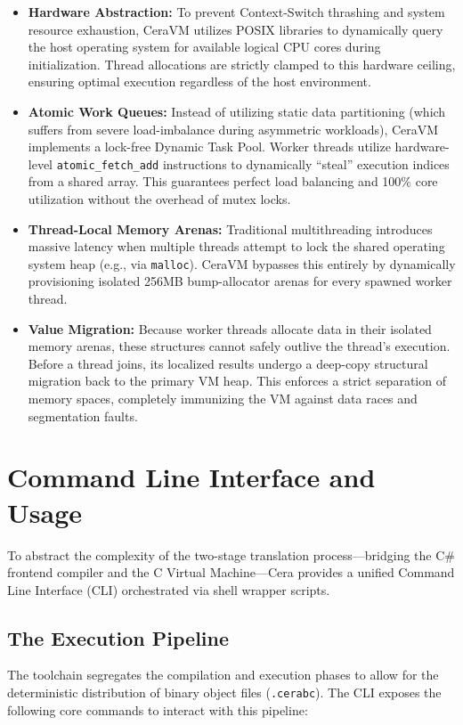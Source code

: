 \documentclass[11pt, a4paper]{article}
\begin{document}
\begin{itemize}
    \item \textbf{Hardware Abstraction:} To prevent Context-Switch thrashing and system resource exhaustion, CeraVM utilizes POSIX libraries to dynamically query the host operating system for available logical CPU cores during initialization. Thread allocations are strictly clamped to this hardware ceiling, ensuring optimal execution regardless of the host environment.
    \item \textbf{Atomic Work Queues:} Instead of utilizing static data partitioning (which suffers from severe load-imbalance during asymmetric workloads), CeraVM implements a lock-free Dynamic Task Pool. Worker threads utilize hardware-level \texttt{atomic\_fetch\_add} instructions to dynamically ``steal'' execution indices from a shared array. This guarantees perfect load balancing and 100\% core utilization without the overhead of mutex locks.
    \item \textbf{Thread-Local Memory Arenas:} Traditional multithreading introduces massive latency when multiple threads attempt to lock the shared operating system heap (e.g., via \texttt{malloc}). CeraVM bypasses this entirely by dynamically provisioning isolated 256MB bump-allocator arenas for every spawned worker thread. 
    \item \textbf{Value Migration:} Because worker threads allocate data in their isolated memory arenas, these structures cannot safely outlive the thread's execution. Before a thread joins, its localized results undergo a deep-copy structural migration back to the primary VM heap. This enforces a strict separation of memory spaces, completely immunizing the VM against data races and segmentation faults.
\end{itemize}

\section{Command Line Interface and Usage}
\noindent
To abstract the complexity of the two-stage translation process—bridging the C\# frontend compiler and the C Virtual Machine—Cera provides a unified Command Line Interface (CLI) orchestrated via shell wrapper scripts. 

\subsection{The Execution Pipeline}
\noindent
The toolchain segregates the compilation and execution phases to allow for the deterministic distribution of binary object files (\texttt{.cerabc}). The CLI exposes the following core commands to interact with this pipeline:
\end{document}
